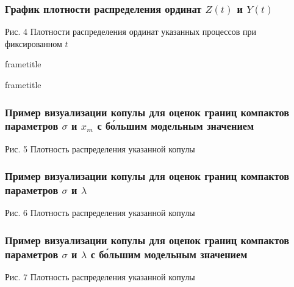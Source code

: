 \documentclass[11pt]{beamer}
\begin{document}
\begin{frame}
\begin{center}
\frametitle{График плотности распределения ординат $Z(t)$ и $Y(t)$}
{\small Рис. 4 Плотности распределения ординат указанных процессов при фиксированном $t$}
\resizebox{\columnwidth}{!}{}
\end{center}
\end{frame}

{
  \nointerlineskip
  \begin{beamercolorbox}[wd=\paperwidth,leftskip=0.3cm,rightskip=0.3cm,ht=5.5ex,dp=1.5ex]{frametitle}
    \scshape \protect\insertframetitle%
  \end{beamercolorbox}%

  \if@useTitleProgressBar
    \nointerlineskip
    \begin{beamercolorbox}[wd=\paperwidth,ht=0.4pt,dp=0pt]{frametitle}
      \progressbar{\paperwidth}
    \end{beamercolorbox}
  \fi
}
\makeatother

\begin{frame}
\begin{center}
\frametitle{Пример визуализации копулы для оценок границ компактов параметров $\sigma$ и $x_m$ с б\'{о}льшим модельным значением}
\resizebox{\columnwidth}{!}{}
{\small Рис. 5 Плотность распределения указанной копулы}
\end{center}
\end{frame}

\begin{frame}
\begin{center}
\frametitle{Пример визуализации копулы для оценок границ компактов параметров $\sigma$ и $\lambda$}
\resizebox{\columnwidth}{!}{}
{\small Рис. 6 Плотность распределения указанной копулы}
\end{center}
\end{frame}

\begin{frame}
\begin{center}
\frametitle{Пример визуализации копулы для оценок границ компактов параметров $\sigma$ и $\lambda$ с б\'{о}льшим модельным значением}
\resizebox{\columnwidth}{!}{}
{\small Рис. 7 Плотность распределения указанной копулы}
\end{center}
\end{frame}
\end{document}
